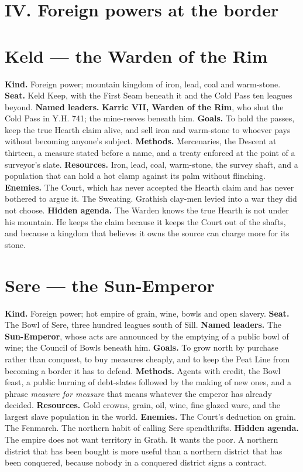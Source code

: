 \documentclass{design/chronicle}
\begin{document}
\CRrule

\section*{IV. Foreign powers at the border}

\section*{Keld — the Warden of the Rim}

\textbf{Kind.} Foreign power; mountain kingdom of iron, lead, coal and warm-stone. \textbf{Seat.} Keld Keep, with the First Seam beneath it and the Cold Pass ten leagues beyond. \textbf{Named leaders.} \textbf{Karric VII, Warden of the Rim}, who shut the Cold Pass in Y.H. 741; the mine-reeves beneath him. \textbf{Goals.} To hold the passes, keep the true Hearth claim alive, and sell iron and warm-stone to whoever pays without becoming anyone’s subject. \textbf{Methods.} Mercenaries, the Descent at thirteen, a measure stated before a name, and a treaty enforced at the point of a surveyor’s slate. \textbf{Resources.} Iron, lead, coal, warm-stone, the survey shaft, and a population that can hold a hot clamp against its palm without flinching. \textbf{Enemies.} The Court, which has never accepted the Hearth claim and has never bothered to argue it. The Sweating. Grathish clay-men levied into a war they did not choose. \textbf{Hidden agenda.} The Warden knows the true Hearth is not under his mountain. He keeps the claim because it keeps the Court out of the shafts, and because a kingdom that believes it owns the source can charge more for its stone.

\section*{Sere — the Sun-Emperor}

\textbf{Kind.} Foreign power; hot empire of grain, wine, bowls and open slavery. \textbf{Seat.} The Bowl of Sere, three hundred leagues south of Sill. \textbf{Named leaders.} The \textbf{Sun-Emperor}, whose acts are announced by the emptying of a public bowl of wine; the Council of Bowls beneath him. \textbf{Goals.} To grow north by purchase rather than conquest, to buy measures cheaply, and to keep the Peat Line from becoming a border it has to defend. \textbf{Methods.} Agents with credit, the Bowl feast, a public burning of debt-slates followed by the making of new ones, and a phrase \emph{measure for measure} that means whatever the emperor has already decided. \textbf{Resources.} Gold crowns, grain, oil, wine, fine glazed ware, and the largest slave population in the world. \textbf{Enemies.} The Court’s deduction on grain. The Fenmarch. The northern habit of calling Sere spendthrifts. \textbf{Hidden agenda.} The empire does not want territory in Grath. It wants the poor. A northern district that has been bought is more useful than a northern district that has been conquered, because nobody in a conquered district signs a contract.
\end{document}

